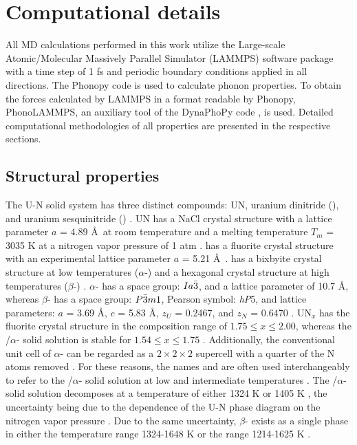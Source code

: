 \documentclass[preprint, 12pt]{elsarticle}
\begin{document}
\section{Computational details}

All MD calculations performed in this work utilize the Large-scale Atomic/Molecular Massively Parallel Simulator (LAMMPS) software package \cite{Thompson2022} with a time step of 1 fs and periodic boundary conditions applied in all directions. The Phonopy code \cite{Togo2015II} is used to calculate phonon properties. To obtain the forces calculated by LAMMPS in a format readable by Phonopy, PhonoLAMMPS, an auxiliary tool of the DynaPhoPy code \cite{Carreras2017}, is used. Detailed computational methodologies of all properties are presented in the respective sections.

\subsection{Structural properties}

The U-N solid system has three distinct compounds: UN, uranium dinitride (), and uranium sesquinitride () \cite{Silva2009}. UN has a NaCl crystal structure with a lattice parameter $a$ = 4.89 \AA\ at room temperature \cite{Hayes1990I} and a melting temperature $T_m$ = 3035 K at a nitrogen vapor pressure of 1 atm \cite{Hayes1990IV}.  has a fluorite crystal structure with an experimental lattice parameter $a$ = 5.21 \AA\ \cite{Tagawa1974}.  has a bixbyite crystal structure at low temperatures ($\alpha$-) and a hexagonal crystal structure at high temperatures ($\beta$-) \cite{Uno2020}. $\alpha$- has a space group: $Ia\Bar{3}$, and a lattice parameter of 10.7 \AA, whereas $\beta$- has a space group: $P\Bar{3}m1$, Pearson symbol: \textit{hP}5, and lattice parameters: $a$ = 3.69 \AA, $c$ = 5.83 \AA, $z_U$ = 0.2467, and $z_N$ = 0.6470 \cite{Price1965, Masaki1975}. UN$_x$ has the fluorite crystal structure in the composition range of $1.75 \leq x \leq 2.00$, whereas the /$\alpha$- solid solution is stable for $1.54 \leq x \leq 1.75$ \cite{Silva2009}. Additionally, the conventional unit cell of $\alpha$- can be regarded as a $2 \times 2 \times 2$  supercell with a quarter of the N atoms removed \cite{Weber2017}. For these reasons, the names  and  are often used interchangeably to refer to the /$\alpha$- solid solution at low and intermediate temperatures \cite{Silva2009, Uno2020}. The /$\alpha$- solid solution decomposes at a temperature of either 1324 K \cite{Uno2020} or 1405 K \cite{Okamoto1997}, the uncertainty being due to the dependence of the U-N phase diagram on the nitrogen vapor pressure \cite{Uno2020}. Due to the same uncertainty, $\beta$- exists as a single phase in either the temperature range 1324-1648 K \cite{Uno2020} or the range 1214-1625 K \cite{Okamoto1997}.
\end{document}
